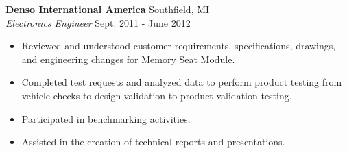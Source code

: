 \vspace{0.75em}

\noindent
\textbf{Denso International America} \hfill Southfield, MI \\
\textit{Electronics Engineer} \hfill Sept. 2011 - June 2012 \\
\begin{itemize}[leftmargin=*,noitemsep,topsep=3pt]
    \item Reviewed and understood customer requirements, specifications, drawings, and engineering changes for Memory Seat Module.
    \item Completed test requests and analyzed data to perform product testing from vehicle checks to design validation to product validation testing.
    \item Participated in benchmarking activities.
    \item Assisted in the creation of technical reports and presentations.
\end{itemize}